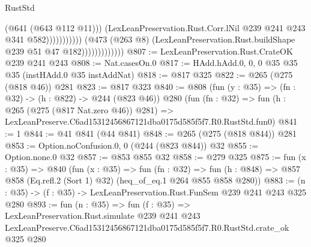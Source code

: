 \begin{lexlean}{RustStd}
\begin{coremodule}
                                                (@641 (@643 @112 @11)))
                                              (LexLeanPreservation.Rust.Corr.lNil
                                                @239
                                                @241
                                                @243
                                                @341
                                                @582)))))))))))
                          (@473
                            (@263 @8)
                            (LexLeanPreservation.Rust.buildShape @239 @51 @47 @182)))))))))))))
@807 := LexLeanPreservation.Rust.CrateOK @239 @241 @243
@808 := Nat.casesOn.{0}
@817 := HAdd.hAdd.{0, 0, 0} @35 @35 @35 (instHAdd.{0} @35 instAddNat)
@818 := @817 @325
@822 := @265 (@275 (@818 @46)) @281
@823 := @817 @323
@840 := @808
    (fun (y : @35) => (fn : @32) -> (h : @822) -> @244 (@823 @46))
    @280
    (fun (fn : @32) =>
    fun (h : @265 (@275 (@817 Nat.zero @46)) @281) =>
    LexLeanPreserve.C6ad15312456867121dba0175d585f5f7.R0.RustStd.fun0)
@841 := 1
@844 := @41 @841 (@44 @841)
@848 := @265 (@275 (@818 @844)) @281
@853 := Option.noConfusion.{0, 0} (@244 (@823 @844)) @32
@855 := Option.none.{0} @32
@857 := @853 @855 @32
@858 := @279 @325
@875 := fun (x : @35) =>
  @840
    (fun (x : @35) =>
    fun (fn : @32) =>
    fun (h : @848) => @857 @858 (Eq.refl.{2} (Sort 1) @32) (heq_of_eq.{1} @264 @855 @858 @280))
@883 := (n : @35) -> (f : @35) -> LexLeanPreservation.Rust.FunSem @239 @241 @243 @325 @280
@893 := fun (n : @35) =>
  fun (f : @35) =>
  LexLeanPreservation.Rust.simulate
    @239
    @241
    @243
    LexLeanPreserve.C6ad15312456867121dba0175d585f5f7.R0.RustStd.crate_ok
    @325
    @280
\end{coremodule}
\end{lexlean}
